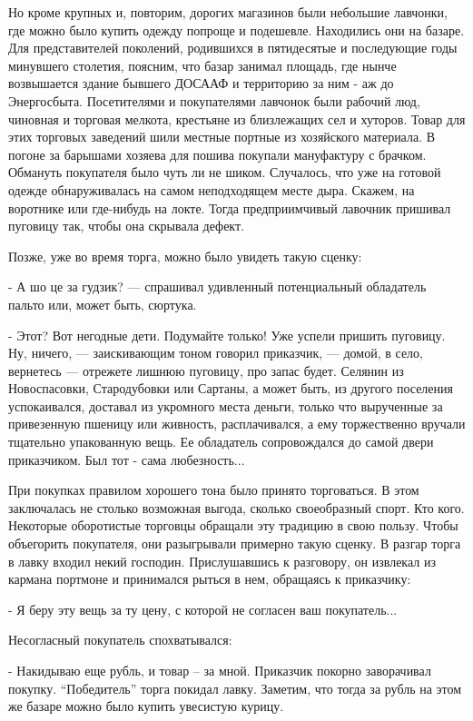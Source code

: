 Но кроме крупных и, повторим, дорогих магазинов были небольшие лавчонки, где
можно было купить одежду попроще и подешевле. Находились они на базаре. Для
представителей поколений, родившихся в пятидесятые и последующие годы минувшего
столетия, поясним, что базар занимал площадь, где нынче возвышается здание
бывшего ДОСААФ и территорию за ним - аж до Энергосбыта. Посетителями и
покупателями лавчонок были рабочий люд, чиновная и торговая мелкота, крестьяне
из близлежащих сел и хуторов.  Товар для этих торговых заведений шили местные
портные из хозяйского материала. В погоне за барышами хозяева для пошива
покупали мануфактуру с брачком. Обмануть покупателя было чуть ли не шиком.
Случалось, что уже на готовой одежде обнаруживалась на самом неподходящем месте
дыра. Скажем, на воротнике или где-нибудь на локте. Тогда предприимчивый
лавочник пришивал пуговицу так, чтобы она скрывала дефект.


Позже, уже во время торга, можно было увидеть такую сценку:

- А шо це за гудзик? — спрашивал удивленный потенциальный обладатель пальто
или, может быть, сюртука.

- Этот? Вот негодные дети. Подумайте только! Уже успели пришить пуговицу. Ну,
ничего, — заискивающим тоном говорил приказчик, — домой, в село, вернетесь —
отрежете лишнюю пуговицу, про запас будет. Селянин из Новоспасовки,
Стародубовки или Сартаны, а может быть, из другого поселения успокаивался,
доставал из укромного места деньги, только что вырученные за привезенную
пшеницу или живность, расплачивался, а ему торжественно вручали тщательно
упакованную вещь. Ее обладатель сопровождался до самой двери приказчиком. Был
тот -  сама любезность...

При покупках правилом хорошего тона было принято торговаться. В этом
заключалась не столько возможная выгода, сколько своеобразный спорт. Кто кого.
Некоторые оборотистые торговцы обращали эту традицию в свою пользу. Чтобы
объегорить покупателя, они разыгрывали примерно такую сценку. В разгар торга в
лавку входил некий господин. Прислушавшись к разговору, он извлекал из кармана
портмоне и принимался рыться в нем, обращаясь к приказчику:

- Я беру эту вещь за ту цену, с которой не согласен ваш покупатель...

Несогласный покупатель спохватывался:

- Накидываю еще рубль, и товар – за мной. Приказчик покорно заворачивал
покупку. \enquote{Победитель} торга покидал лавку. Заметим, что тогда за рубль на этом
же базаре можно было купить увесистую курицу.

